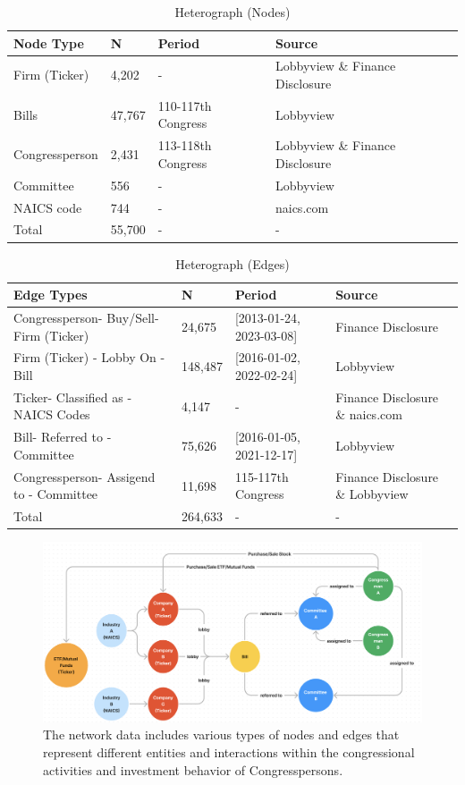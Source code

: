 \documentclass[15pt,letterpaper]{article}
\begin{document}
\begin{table}[h!]
  \centering
  \caption{Heterograph (Nodes)}
  \label{tab:nodes}
  \begin{tabular}{@{}llll@{}}
  \toprule
  Node Type & N & Period & Source \\ \midrule
  Firm (Ticker) & 4,202 & - & Lobbyview \& Finance Disclosure \\
  Bills & 47,767 & 110-117th Congress & Lobbyview \\
  Congressperson & 2,431 & 113-118th Congress & Lobbyview \& Finance Disclosure \\
  Committee & 556 & - & Lobbyview \\
  NAICS code & 744 & - &  naics.com \\ 
  \bottomrule
  Total & 55,700 & - & - \\
  \bottomrule

  \end{tabular}
\end{table}

\begin{table}[h!]
  \centering
  \caption{Heterograph (Edges)}
  \label{tab:edges}
  \begin{tabular}{@{}llll@{}}
  \toprule
  Edge Types & N & Period & Source \\ \midrule
  Congressperson- Buy/Sell- Firm (Ticker) & 24,675 & [2013-01-24, 2023-03-08] & Finance Disclosure \\
  Firm (Ticker) - Lobby On - Bill & 148,487 & [2016-01-02, 2022-02-24] & Lobbyview \\
  Ticker- Classified as - NAICS Codes & 4,147 & - & Finance Disclosure \& naics.com \\
  Bill- Referred to - Committee & 75,626 & [2016-01-05, 2021-12-17] & Lobbyview \\
  Congressperson- Assigend to - Committee & 11,698 & 115-117th Congress & Finance Disclosure \& Lobbyview \\ 
  \bottomrule
  Total & 264,633 & - & - \\
  \bottomrule
  \end{tabular}
  \end{table}

\begin{figure}[h!]
  \centering
  \includegraphics[width=1.0\textwidth]{imgs/etfmf.png}
  \caption{The network data includes various types of nodes and edges that represent different entities and interactions within the congressional activities and investment behavior of Congresspersons.}
  \label{fig:cbd}
\end{figure}
\end{document}
